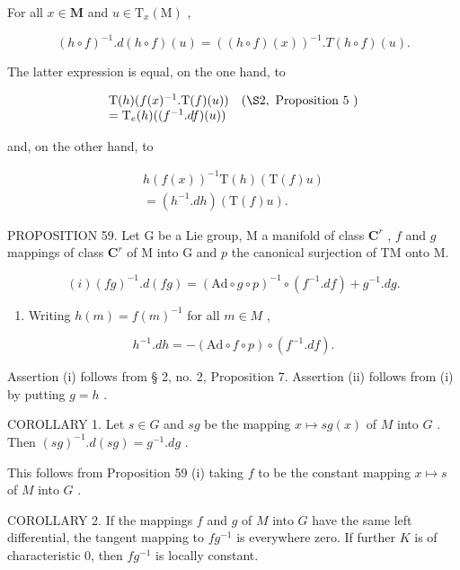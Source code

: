 For all \(x \in \mathbf{M}\) and \(u \in \mathrm{T}_x(\mathrm{M})\) ,

\[
(h \circ f) ^ {- 1}. d (h \circ f) (u) = ((h \circ f) (x)) ^ {- 1}. T (h \circ f) (u).
\]

The latter expression is equal, on the one hand, to

\[
\begin{array}{l l} \mathrm{T} (h) (f (x) ^ {- 1}. \mathrm{T} (f) (u)) & (\S 2, \text { Proposition   5 }) \\ = \mathrm{T} _ {e} (h) ((f ^ {- 1}. d f) (u)) \end{array}
\]

and, on the other hand, to

\[
\begin{array}{c} h (f (x)) ^ {- 1} \mathrm{T} (h) (\mathrm{T} (f) u) \\ = (h ^ {- 1}. d h) (\mathrm{T} (f) u). \end{array}
\]

PROPOSITION 59. Let G be a Lie group, M a manifold of class \(\mathbf{C}^r\) , \(f\) and \(g\) mappings of class \(\mathbf{C}^r\) of M into G and \(p\) the canonical surjection of TM onto M.

\[
(i) (f g) ^ {- 1}. d (f g) = (\mathrm{Ad} \circ g \circ p) ^ {- 1} \circ (f ^ {- 1}. d f) + g ^ {- 1}. d g.
\]

\begin{enumerate}
\def\labelenumi{(\roman{enumi})}
\setcounter{enumi}{1}
\tightlist
\item
  Writing \(h(m) = f(m)^{-1}\) for all \(m \in M\) ,
\end{enumerate}

\[
h ^ {- 1}. d h = - (\mathrm{Ad} \circ f \circ p) \circ (f ^ {- 1}. d f).
\]

Assertion (i) follows from § 2, no. 2, Proposition 7. Assertion (ii) follows from (i) by putting \(g = h\) .

COROLLARY 1. Let \(s \in G\) and \(sg\) be the mapping \(x \mapsto sg(x)\) of \(M\) into \(G\) . Then \((sg)^{-1}.d(sg) = g^{-1}.dg\) .

This follows from Proposition 59 (i) taking \(f\) to be the constant mapping \(x \mapsto s\) of \(M\) into \(G\) .

COROLLARY 2. If the mappings \(f\) and \(g\) of \(M\) into \(G\) have the same left differential, the tangent mapping to \(fg^{-1}\) is everywhere zero. If further \(K\) is of characteristic 0, then \(fg^{-1}\) is locally constant.

